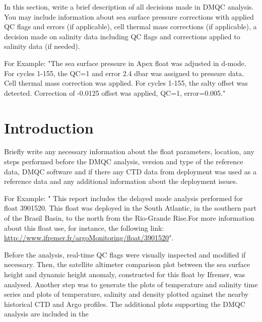 \documentclass{article}
\newcommand{\WMOnum}{3901520} %
\begin{document}
\begin{flushleft}%
In this section, write a brief description of all decisions made in DMQC analysis. You may include information about sea surface pressure corrections with applied QC flags and errors (if applicable), cell thermal mass corrections (if applicable), a decision made on salinity data including QC flags and corrections applied to salinity data (if needed).
\vspace{0.5cm}

For Example:
"The sea surface pressure in Apex float was adjusted in d-mode. For cycles 1-155, the QC=1 and error 2.4 dbar was assigned to pressure data. Cell thermal mass correction was applied.
For cycles 1-155, the salty offset was detected. Correction of -0.0125 offset was applied, QC=1, error=0.005."

\newpage
\tableofcontents

\newpage
\section{Introduction}
 
Briefly write any necessary information about the float parameters, location, any steps performed before the DMQC analysis, version and type of the reference data, DMQC software and if there any CTD data from deployment was used as a reference data and any additional information about the deployment issues.	
\vspace{0.5cm}

For Example: 
" This report includes the delayed mode analysis performed for float \hspace{0.5mm} \WMOnum. This float was deployed in the South Atlantic, in the southern part of the Brasil Basin, to the north from the Rio-Grande Rise.For more information about this float use, for instance, the following link:
\href{url}{http://www.ifremer.fr/argoMonitoring/float/\WMOnum}".

\medskip
Before the analysis, real-time QC flags were visually inspected and modified if necessary. Then, the satellite altimeter comparison plot between the sea surface height and dynamic height anomaly, constructed for this float by Ifremer, was analysed. Another step was to generate the plots of temperature and salinity time series and plots of temperature, salinity and density plotted against the nearby historical CTD and Argo profiles. The additional plots supporting the DMQC analysis are included in the 


\end{flushleft}
\end{document}
